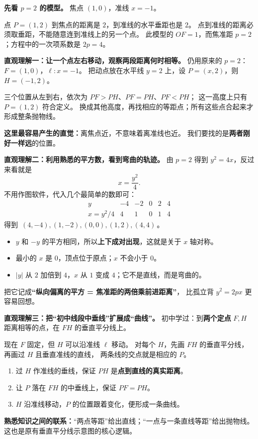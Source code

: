 \begin{explanationbox}
\textbf{先看 $p=2$ 的模型。} 焦点 $(1,0)$，准线 $x=-1$。

点 $P=(1,2)$ 到焦点的距离是 $2$，到准线的水平垂距也是 $2$。
点到准线的距离必须取垂距，不能随意连到准线上的另一个点。
此模型的 $OF=1$，而焦准距 $p=2$；方程中的一次项系数是 $2p=4$。
\end{explanationbox}
\clearpage

\begin{explanationbox}
\textbf{直观理解一：让一个点左右移动，观察两段距离何时相等。}
仍用原来的 $p=2$：$F=(1,0)$，$\ell:x=-1$。
把动点放在水平线 $y=2$ 上，设 $P=(x,2)$，则 $H=(-1,2)$。

三个位置从左到右，依次为 $PF>PH$、$PF=PH$、$PF<PH$；
这一高度上只有 $P=(1,2)$ 符合定义。
换成其他高度，再找相应的等距点；所有这些点合起来才形成整条抛物线。

\textbf{这里最容易产生的直觉：}离焦点近，不意味着离准线也近。
我们要找的是\textbf{两者刚好一样远}的位置。
\end{explanationbox}
\clearpage
\begin{explanationbox}
\textbf{直观理解二：利用熟悉的平方数，看到弯曲的轨迹。}
由 $p=2$ 得到 $y^2=4x$，反过来看就是
\[
\boxed{x=\frac{y^2}{4}}.
\]
不用作图软件，代入几个最简单的数即可：
\[
\begin{array}{c|ccccc}
y & -4 & -2 & 0 & 2 & 4 \\ \hline
x=y^2/4 & 4 & 1 & 0 & 1 & 4
\end{array}
\]
得到 $\,(4,-4),(1,-2),(0,0),(1,2),(4,4)\,$。
\begin{itemize}[leftmargin=*]
\item $y$ 和 $-y$ 的平方相同，所以\textbf{上下成对出现}，这就是关于 $x$ 轴对称。
\item 最小的 $x$ 是 $0$，顶点位于原点；$x$ 不会小于 $0$。
\item $|y|$ 从 $2$ 加倍到 $4$，$x$ 从 $1$ 变成 $4$；它不是直线，而是弯曲的。
\end{itemize}
把它记成\textbf{“纵向偏离的平方 = 焦准距的两倍乘前进距离”}，
比孤立背 $y^2=2px$ 更容易回想。
\end{explanationbox}
\clearpage
\begin{explanationbox}
\textbf{直观理解三：把“初中线段中垂线”扩展成“曲线”。}
初中学过：到\textbf{两个定点} $F,H$ 距离相等的点，在 $FH$ 的垂直平分线上。

现在 $F$ 固定，但 $H$ 可以沿准线 $\ell$ 移动。
对每个 $H$，先画 $FH$ 的垂直平分线，再画过 $H$ 且垂直准线的直线，
两条线的交点就是相应的 $P$。
\begin{enumerate}[leftmargin=*]
\item 过 $H$ 作准线的垂线，保证 $PH$ 是\textbf{点到直线的真实距离}。
\item 让 $P$ 落在 $FH$ 的中垂线上，保证 $PF=PH$。
\item $H$ 沿准线移动，$P$ 的位置跟着变化，便形成一条曲线。
\end{enumerate}
\textbf{熟悉知识之间的联系：}“两点等距”给出直线；“一点与一条直线等距”给出抛物线。
这也是原有垂直平分线示意图的核心逻辑。
\end{explanationbox}
